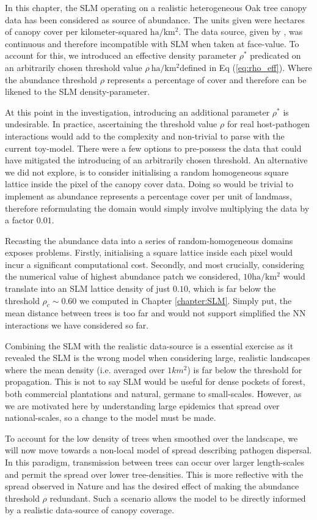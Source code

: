 In this chapter, the SLM operating on a realistic heterogeneous Oak tree canopy data has been considered as source of abundance. %
The units given were hectares of canopy cover per kilometer-squared $\mathrm{ha/km^2}$. %
The data source, given by \cite{hill.data}, was continuous and therefore incompatible with SLM %
when taken at face-value. %
To account for this, we introduced an effective density parameter $\rho^*$ predicated on an %
arbitrarily chosen threshold value $\rho\ \mathrm{ha/km^2}$\textemdash defined in Eq (\ref{eq:rho_eff}). %
Where the abundance threshold $\rho$ represents a percentage of cover and therefore can be likened to the SLM density-parameter. %

At this point in the investigation, introducing an additional parameter $\rho^*$ is undesirable. %
In practice, ascertaining the threshold value $\rho$ for real host-pathogen interactions would add to the complexity and non-trivial to parse with the current toy-model. %
There were a few options to pre-possess the data that could have mitigated the introducing of an arbitrarily chosen threshold. %
An alternative we did not explore, is to consider initialising a random homogeneous square lattice inside the pixel of the canopy cover data. %
Doing so would be trivial to implement as abundance represents a percentage cover per unit of landmass, therefore reformulating the domain would simply involve multiplying the data by a factor $0.01$. %

Recasting the abundance data into a series of random-homogeneous domains exposes problems. %
Firstly, initialising a square lattice inside each pixel would incur a significant computational cost. %
Secondly, and most crucially, considering the numerical value of highest abundance patch we considered, $10\mathrm{ha/km^2}$ would translate into an SLM lattice density of just $0.10$, which  is far below the threshold $\rho_c \sim 0.60$ we computed in Chapter \ref{chapter:SLM}.%
Simply put, the mean distance between trees is too far and would not support simplified the NN interactions we have considered so far. 

Combining the SLM with the realistic data-source is a essential exercise as it revealed the SLM is the wrong model when considering large, realistic landscapes where the mean density (i.e. averaged over $1km^2$) is far below the threshold for propagation. %
This is not to say SLM would be useful for dense pockets of forest, both commercial plantations and natural, germane to small-scales. %
However, as we are motivated here by understanding large epidemics that spread over national-scales, so a change to the model must be made. 

To account for the low density of trees when smoothed over the landscape, we will now move towards a non-local model of spread describing pathogen dispersal. %
In this paradigm, transmission between trees can occur over larger length-scales and permit the spread over lower tree-densities. %
This is more reflective with the spread observed in Nature and has the desired effect of making the abundance threshold $\rho$ redundant. %
Such a scenario  allows the model to be directly informed by a realistic data-source of canopy coverage.
\newpage
